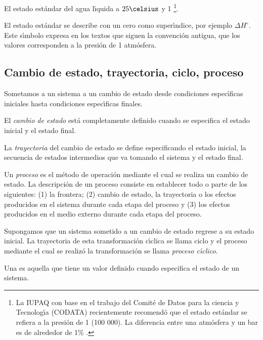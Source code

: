 \begin{example}El estado est\'andar del agua l\'{\i}quida a $25\celsius$ y 1 \bbar \footnote{ La IUPAQ con base en el trabajo del Comit\'e de Datos para la ciencia y Tecnolog\'{\i}a (CODATA) recientemente recomend\'o que el estado est\'andar se refiera a la presi\'on de 1 \bbar (100 000\pascal). La diferencia entre una atm\'osfera y un bar es de alrededor de 1\% .}.
\end{example}

 El estado est\'andar se describe con un cero como super\'{\i}ndice, por ejemplo $\Delta H^\circ$. Este s\'{\i}mbolo expresa en los textos que siguen la convenci\'on antigua, que los valores corresponden a  la presi\'on de 1 atm\'osfera.

\subsection{Cambio de estado, trayectoria, ciclo, proceso}

Sometamos a un sistema a un cambio de estado  desde
condiciones espec\'{\i}ficas iniciales hasta condiciones espec\'{\i}ficas finales.

El \textit{cambio de estado} est\'a completamente  definido cuando se especifica el estado inicial y el estado final.

La \textit{trayectoria}  del cambio de estado se define especificando el estado inicial, la secuencia de estados intermedios que va tomando el sistema y el estado final.

Un \textit{proceso}  es el m\'etodo de operaci\'on mediante el cual se realiza un cambio de estado. La descripci\'on de un proceso consiste en establecer todo o parte de los siguientes: (1) la frontera; (2) cambio de estado, la trayectoria o los efectos producidos en el sistema durante cada etapa del proceso y (3) los efectos producidos en el medio externo durante cada etapa del proceso.

Supongamos que un sistema sometido a un cambio de estado regrese a su estado inicial. La trayectoria de esta transformaci\'on c\'{\i}clica se llama ciclo y el proceso mediante el cual se realiz\'o la transformaci\'on se llama \textit{proceso c\'{\i}clico}.

Una \textit{}  es aquella que tiene un
valor definido cuando especifica el estado de un sistema.

